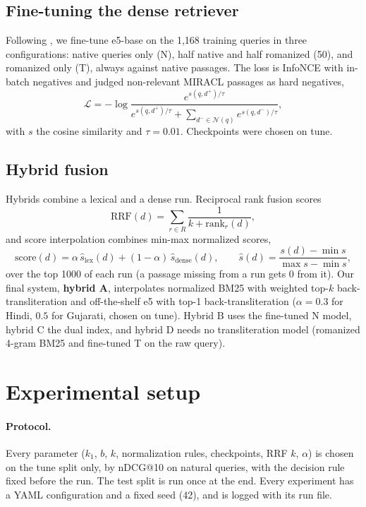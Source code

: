 \documentclass[11pt,a4paper]{article}
\begin{document}
\subsection{Fine-tuning the dense retriever}
Following \citet{chari2025lost}, we fine-tune e5-base on the 1,168 training queries in three
configurations: native queries only (N), half native and half romanized (50), and romanized
only (T), always against native passages. The loss is InfoNCE with in-batch negatives and
judged non-relevant MIRACL passages as hard negatives,
\begin{equation}
  \mathcal{L} = -\log \frac{e^{s(q,d^+)/\tau}}
  {e^{s(q,d^+)/\tau} + \sum_{d^- \in \mathcal{N}(q)} e^{s(q,d^-)/\tau}},
\end{equation}
with $s$ the cosine similarity and $\tau = 0.01$. Checkpoints were chosen on tune.

\subsection{Hybrid fusion}
Hybrids combine a lexical and a dense run. Reciprocal rank fusion \citep{cormack2009rrf}
scores
\begin{equation}
  \mathrm{RRF}(d) = \sum_{r \in R} \frac{1}{k + \mathrm{rank}_r(d)},
\end{equation}
and score interpolation combines min-max normalized scores,
\begin{equation}
  \mathrm{score}(d) = \alpha\, \hat{s}_{\mathrm{lex}}(d) + (1-\alpha)\, \hat{s}_{\mathrm{dense}}(d),
  \qquad \hat{s}(d) = \frac{s(d) - \min s}{\max s - \min s},
\end{equation}
over the top 1000 of each run (a passage missing from a run gets 0 from it). Our final
system, \textbf{hybrid A}, interpolates normalized BM25 with weighted top-$k$
back-transliteration and off-the-shelf e5 with top-1 back-transliteration ($\alpha = 0.3$ for
Hindi, $0.5$ for Gujarati, chosen on tune). Hybrid B uses the fine-tuned N model, hybrid C the
dual index, and hybrid D needs no transliteration model (romanized 4-gram BM25 and
fine-tuned T on the raw query).

\section{Experimental setup}

\paragraph{Protocol.} Every parameter ($k_1$, $b$, $k$, normalization rules, checkpoints,
RRF $k$, $\alpha$) is chosen on the tune split only, by nDCG@10 on natural queries, with the
decision rule fixed before the run. The test split is run once at the end. Every experiment
has a YAML configuration and a fixed seed (42), and is logged with its run file.
\end{document}
